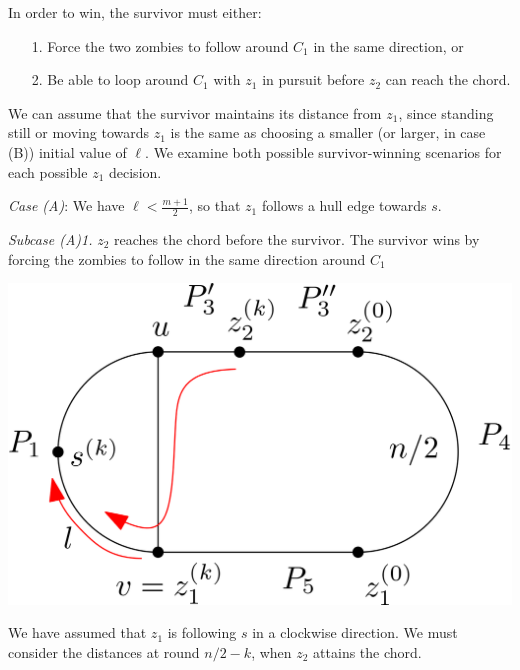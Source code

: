 \documentclass[letterpaper, 10pt]{article}
\begin{document}
\begin{enumerate}
       In order to win, the survivor must either:

       \begin{enumerate}
        \item[1.] Force the two zombies to follow around $C_1$ in the same direction, or
        \item[2.] Be able to loop around $C_1$ with $z_1$ in pursuit before $z_2$ can reach the chord.
       \end{enumerate}

       We can assume that the survivor maintains its distance from $z_1$, since
       standing still or moving towards $z_1$ is the same as choosing a smaller (or larger, in case (B))
       initial value of $\ell$.
       We examine both possible survivor-winning scenarios for each possible $z_1$ decision.

       \emph{Case (A)}: We have $\ell < \frac{m+1}{2}$, so that $z_1$ follows a hull edge towards $s$.

       \emph{Subcase (A)1.} $z_2$ reaches the chord before the survivor.
       The survivor wins by forcing the zombies to follow in the same direction around $C_1$

       \begin{center}
        \includegraphics[scale=0.15]{diagramCaseA1_1}
       \end{center}

       We have assumed that $z_1$ is following $s$ in a clockwise direction. We must consider the distances at
       round $n/2 - k$, when $z_2$ attains the chord.


\end{enumerate}
\end{document}
